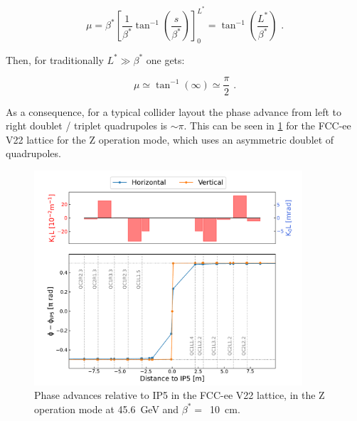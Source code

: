 \begin{equation}
    \mu = \beta^{\ast} \left[\frac{1}{\beta^{\ast}} \tan^{-1} \left(\frac{s}{\beta^{\ast}} \right) \right]_0^{L^*} = \tan^{-1} \left(\frac{L^*}{\beta^{\ast}} \right) \text{ .}
    \label{equation:collider_drift_space_phase_advance_integrated}
\end{equation}
\vspace{1pt}

Then, for traditionally \(L^* \gg \beta^{\ast}\) one gets:

\begin{equation}
    \mu \simeq \tan^{-1} \left( \infty \right) \simeq \frac{\pi}{2} \text{ .}
    \label{equation:collider_drift_space_phase_advance_approximation}
\end{equation}

As a consequence, for a typical collider layout the phase advance from left to right doublet / triplet quadrupoles is \(\sim \pi\).
This can be seen in \cref{figure:fccee_phases_to_ip5} for the \acrshort{FCC}-ee~\cite{EPJST:Abada:FCCee_Lepton_Collider} V\num{22} lattice for the Z operation mode, which uses an asymmetric doublet of quadrupoles.

\begin{figure}[!htb]
    \centering
    \includegraphics*[width=0.89\textwidth]{Figures/IR_Coupling_Correction/fccee_phases_to_ip5.pdf}
    \caption{Phase advances relative to IP\num{5} in the FCC-ee V22 lattice, in the Z operation mode at \qty{45.6}{\giga\electronvolt} and \(\beta^{\ast}=\)~\qty{10}{\centi\meter}.}
    \label{figure:fccee_phases_to_ip5}
\end{figure}


